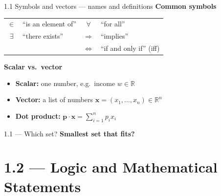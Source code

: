 \documentclass[11pt,aspectratio=169]{beamer}
\newcommand{\QFrame}[1]{%
  \begin{frame}{#1 \quad {\small\textcolor{mAccent}{Together}}}}
\begin{document}
\begin{frame}{1.1 Symbols and vectors --- names and definitions}
  \textbf{Common symbols}
  \small
  \begin{tabular}{@{}cl@{\quad}cl@{}}
    $\in$ & ``is an element of'' &
    $\forall$ & ``for all'' \\
    $\exists$ & ``there exists'' &
    $\Rightarrow$ & ``implies'' \\
    & &
    $\Leftrightarrow$ & ``if and only if'' (iff) \\
  \end{tabular}

  \medskip
  \normalsize
  \textbf{Scalar vs.\ vector}
  \small
  \begin{itemize}
    \item \textbf{Scalar:} one number, e.g.\ income $w\in\mathbb{R}$
    \item \textbf{Vector:} a list of numbers
      $\mathbf{x}=(x_1,\ldots,x_n)\in\mathbb{R}^n$
    \item \textbf{Dot product:} $\mathbf{p}\cdot\mathbf{x}=\sum_{i=1}^n p_i x_i$
  \end{itemize}
\end{frame}

\QFrame{1.1 --- Which set?}
  \small
  \textbf{Smallest set that fits?}

  \medskip


\end{frame}

\section{1.2 --- Logic and Mathematical Statements}
\end{document}
